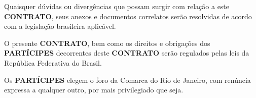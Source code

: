 
\xx Quaisquer dúvidas ou divergências que possam surgir com relação a este \textbf{CONTRATO}, seus anexos e documentos correlatos serão resolvidas de acordo com a legislação brasileira aplicável.

\xx O presente \textbf{CONTRATO}, bem como os direitos e obrigações dos \textbf{PARTÍCIPES} decorrentes deste \textbf{CONTRATO} serão regulados pelas leis da República Federativa do Brasil.

\xx Os \textbf{PARTÍCIPES} elegem o foro da Comarca do Rio de Janeiro, com renúncia expressa a qualquer outro, por mais privilegiado que seja.